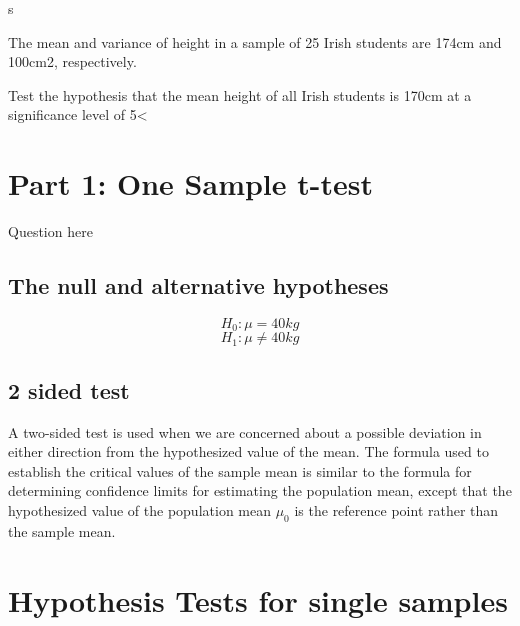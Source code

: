 s\documentclass[]{report}
\begin{document}
The mean and variance of height in a sample of 25 Irish students are 174cm and 100cm2, respectively.

Test the hypothesis that the mean height of all Irish students is 170cm at a significance level of 5<%


\section*{Part 1: One Sample t-test}
Question here

\subsection*{The null and alternative hypotheses}
\[ H_0: \mu = 40 kg\]
\[ H_1: \mu \neq 40 kg\]




\subsection{2 sided test}
A two-sided test is used when we are concerned about a possible
deviation in either direction from the hypothesized value of the
mean. The formula used to establish the critical values of the
sample mean is similar to the formula for determining confidence
limits for estimating the population mean, except that the
hypothesized value of the population mean $\mu_0$ is the reference
point rather than the sample mean.







\section{Hypothesis Tests for single samples}
\end{document}
